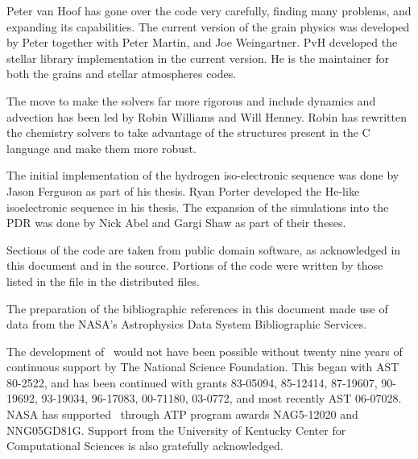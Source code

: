 Peter van Hoof has gone over the code very carefully, finding many
problems, and expanding its capabilities.  The current version of the grain
physics was developed by Peter together with Peter Martin, and Joe
Weingartner.  PvH developed the stellar library implementation in the current
version.  He is the maintainer for both the grains and stellar atmospheres
codes.

The move to make the solvers far more rigorous and include dynamics and
advection has been led by Robin Williams and Will Henney.  Robin has
rewritten the chemistry solvers to take advantage of the structures present
in the C language and make them more robust.

The initial implementation of the hydrogen iso-electronic sequence was
done by Jason Ferguson as part of his thesis. Ryan Porter developed the
He-like isoelectronic sequence in his thesis. The expansion of the
simulations into the PDR was done by Nick Abel and Gargi Shaw as part of
their theses.

Sections of the code are taken from public domain software, as
acknowledged in this document and in the source.
Portions of the code were written by those listed in the
 file in the distributed files.

The preparation of the bibliographic references in this document made
use of data from the NASA's Astrophysics Data System Bibliographic
Services.

The development of \Cloudy\ would not have been possible without
twenty nine years of continuous support by The National Science
Foundation.  This began with AST 80-2522, and has been continued with
grants 83-05094, 85-12414, 87-19607, 90-19692, 93-19034, 96-17083,
00-71180, 03-0772, and most recently AST 06-07028.  NASA has supported
\Cloudy\ through ATP program awards NAG5-12020 and NNG05GD81G.
Support from the University of Kentucky Center for Computational
Sciences is also gratefully acknowledged.

